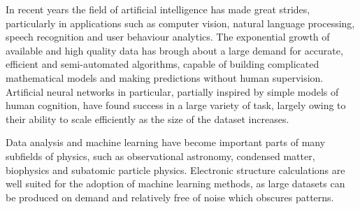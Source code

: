 In recent years the field of artificial intelligence has
made great strides, particularly in applications such
as computer vision, natural language processing,
speech recognition and user behaviour analytics.
The exponential growth of available and high quality
data has brough about a large demand for accurate, efficient
and semi-automated algorithms, capable of building complicated
mathematical models and making predictions without human supervision.
Artificial neural networks in particular, partially inspired by simple
models of human cognition, have found success in a large variety
of task, largely owing to their ability to scale efficiently
as the size of the dataset increases.
\par
Data analysis and machine learning have become important parts
of many subfields of physics, such as observational astronomy,
condensed matter, biophysics and subatomic particle physics.
Electronic structure calculations are well suited for the
adoption of machine learning methods, as large datasets
can be produced on demand and relatively free of noise which
obscures patterns.

